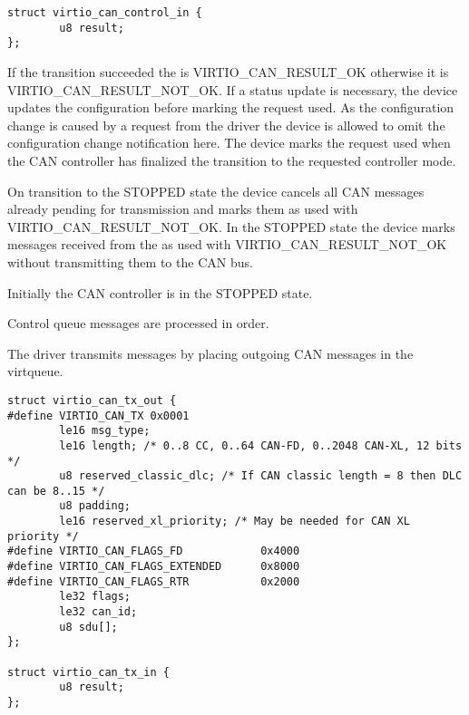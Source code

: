 \begin{lstlisting}
struct virtio_can_control_in {
        u8 result;
};
\end{lstlisting}

If the transition succeeded the  is VIRTIO_CAN_RESULT_OK
otherwise it is VIRTIO_CAN_RESULT_NOT_OK. If a status update is
necessary, the device updates the configuration  before
marking the request used. As the configuration  change is
caused by a request from the driver the device is allowed to omit the
configuration change notification here. The device marks the request
used when the CAN controller has finalized the transition to the
requested controller mode.

On transition to the STOPPED state the device cancels all CAN messages
already pending for transmission and marks them as used with
 VIRTIO_CAN_RESULT_NOT_OK. In the STOPPED state the
device marks messages received from the
 as used with  VIRTIO_CAN_RESULT_NOT_OK without
transmitting them to the CAN bus.

Initially the CAN controller is in the STOPPED state.

Control queue messages are processed in order.


The driver transmits messages by placing outgoing CAN messages in the
 virtqueue.

\label{struct virtio-can-tx-out}
\begin{lstlisting}
struct virtio_can_tx_out {
#define VIRTIO_CAN_TX 0x0001
        le16 msg_type;
        le16 length; /* 0..8 CC, 0..64 CAN-FD, 0..2048 CAN-XL, 12 bits */
        u8 reserved_classic_dlc; /* If CAN classic length = 8 then DLC can be 8..15 */
        u8 padding;
        le16 reserved_xl_priority; /* May be needed for CAN XL priority */
#define VIRTIO_CAN_FLAGS_FD            0x4000
#define VIRTIO_CAN_FLAGS_EXTENDED      0x8000
#define VIRTIO_CAN_FLAGS_RTR           0x2000
        le32 flags;
        le32 can_id;
        u8 sdu[];
};

struct virtio_can_tx_in {
        u8 result;
};
\end{lstlisting}

